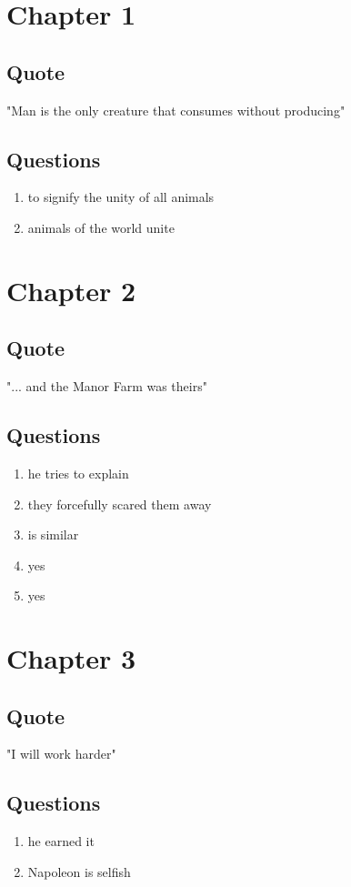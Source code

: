 \documentclass[8pt, letterpaper]{article}
\begin{document}
\section{Chapter 1}

\subsection{Quote}
"Man is the only creature that consumes without producing"

\subsection{Questions}
\begin{enumerate}
  \item to signify the unity of all animals
  \item animals of the world unite
\end{enumerate}

\section{Chapter 2}

\subsection{Quote}
"... and the Manor Farm was theirs"

\subsection{Questions}
\begin{enumerate}
  \item he tries to explain
  \item they forcefully scared them away
  \item is similar
  \item yes
  \item yes
\end{enumerate}

\section{Chapter 3}

\subsection{Quote}
"I will work harder"

\subsection{Questions}
\begin{enumerate}
  \item he earned it
  \item Napoleon is selfish
\end{enumerate}
\end{document}

